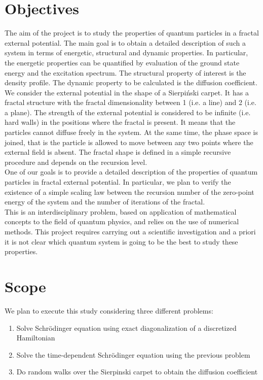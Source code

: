 \documentclass{article}
\begin{document}
\section{Objectives}
The aim of the project is to study the properties of quantum particles in a fractal external 
potential. The main goal is to obtain a detailed description of such a system in terms of 
energetic, structural and dynamic properties. In particular, the energetic properties can 
be quantified by evaluation of the ground state energy and the excitation spectrum. The 
structural property of interest is the density profile. The dynamic property to be calculated
is the diffusion coefficient.\\

We consider the external potential in the shape of a Sierpiński carpet. It has a fractal 
structure with the fractal dimensionality between 1 (i.e. a line) and 2 (i.e. a plane). 
The strength of the external potential is considered to be infinite (i.e. hard walls) in 
the positions where the fractal is present. It means that the particles cannot diffuse 
freely in the system. At the same time, the phase space is joined, that is the particle is 
allowed to move between any two points where the external field is absent. The fractal shape 
is defined in a simple recursive procedure and depends on the recursion level.\\

One of our goals is to provide a detailed description of the properties of quantum particles 
in fractal external potential. In particular, we plan to verify the existence of a simple 
scaling law between the recursion number of the zero-point energy of the system and the 
number of iterations of the fractal.\\

This is an interdisciplinary problem, based on application of mathematical concepts to the 
field of quantum physics, and relies on the use of numerical methods. This project requires 
carrying out a scientific investigation and a priori it is not clear which quantum system 
is going to be the best to study these properties.

\section{Scope}
We plan to execute this study considering three different problems:

\begin{enumerate}
    \item Solve Schrödinger equation using exact diagonalization of a discretized Hamiltonian
    \item Solve the time-dependent Schrödinger equation using the previous problem
    \item Do random walks over the Sierpinski carpet to obtain the diffusion coefficient 
\end{enumerate}
\end{document}
